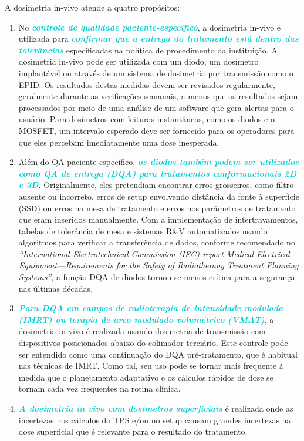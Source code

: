 \documentclass[11pt,a4paper]{article}
\begin{document}
	A dosimetria in-vivo atende a quatro propósitos:

	\begin{enumerate}[label=\textcolor{CarnationPink}{\roman*.}]
		\item No \textcolor{DarkTurquoise}{\textbf{\textit{controle de qualidade paciente-específico}}}, a dosimetria in-vivo é utilizada para \textcolor{DarkTurquoise}{\textbf{\textit{confirmar que a entrega do tratamento está dentro das tolerâncias}}} especificadas na política de procedimento da instituição. A dosimetria in-vivo pode ser utilizada com um diodo, um dosímetro implantável ou através de um sistema de dosimetria por transmissão como o EPID. Os resultados destas medidas devem ser revisados regularmente, geralmente durante as verificações semanais, a menos que os resultados sejam processados por meio de uma análise de um software que gera alertas para o usuário. Para dosímetros com leituras instantâneas, como os diodos e o MOSFET, um intervalo esperado deve ser fornecido para os operadores para que eles percebam imediatamente uma dose inesperada.
		
		\item Além do QA paciente-específico, \textcolor{DarkTurquoise}{\textbf{\textit{os diodos também podem ser utilizados como QA de entrega (DQA) para tratamentos conformacionais 2D e 3D}}}. Originalmente, eles pretendiam encontrar erros grosseiros, como filtro ausente ou incorreto, erros de setup envolvendo distância da fonte à superfície (SSD) ou erros na mesa de tratamento e erros nos parâmetros de tratamento que eram inseridos manualmente. Com a implementação de intertravamentos, tabelas de tolerância de mesa e sistemas R\&V automatizados usando algoritmos para verificar a transferência de dados, conforme recomendado no \textit{``International Electrotechnical Commission (IEC) report Medical Electrical Equipment—Requirements for the Safety of Radiotherapy Treatment Planning Systems''}, a função DQA de diodos tornou-se menos crítica para a segurança nas últimas décadas.
		
		\item \textcolor{DarkTurquoise}{\textbf{\textit{Para DQA em campos de radioterapia de intensidade modulada (IMRT) ou terapia de arco modulado volumétrico (VMAT)}}}, a dosimetria in-vivo é realizada usando dosimetria de transmissão com dispositivos posicionados abaixo do colimador terciário. Este controle pode ser entendido como uma continuação do DQA pré-tratamento, que é habitual nas técnicas de IMRT. Como tal, seu uso pode se tornar mais frequente à medida que o planejamento adaptativo e os cálculos rápidos de dose se tornam cada vez frequentes na rotina clínica.
		
		\item \textcolor{DarkTurquoise}{\textbf{\textit{A dosimetria in vivo com dosímetros superficiais}}} é realizada onde as incertezas nos cálculos do TPS e/ou no setup causam grandes incertezas na dose superficial que é relevante para o resultado do tratamento.
	\end{enumerate}
\end{document}
